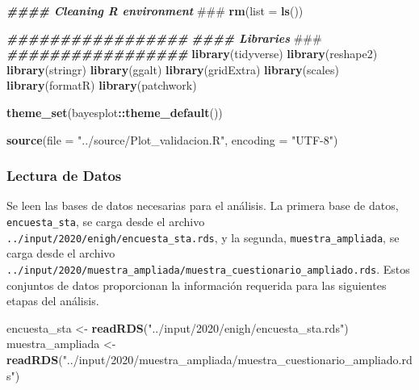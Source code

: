 \documentclass[
  12pt,
]{book}
\newenvironment{Shaded}{\begin{snugshade}}{\end{snugshade}}
\newcommand{\AlertTok}[1]{\textcolor[rgb]{0.94,0.16,0.16}{#1}}
\newcommand{\AttributeTok}[1]{\textcolor[rgb]{0.13,0.29,0.53}{#1}}
\newcommand{\DocumentationTok}[1]{\textcolor[rgb]{0.56,0.35,0.01}{\textbf{\textit{#1}}}}
\newcommand{\FunctionTok}[1]{\textcolor[rgb]{0.13,0.29,0.53}{\textbf{#1}}}
\newcommand{\NormalTok}[1]{#1}
\newcommand{\OtherTok}[1]{\textcolor[rgb]{0.56,0.35,0.01}{#1}}
\newcommand{\SpecialCharTok}[1]{\textcolor[rgb]{0.81,0.36,0.00}{\textbf{#1}}}
\newcommand{\StringTok}[1]{\textcolor[rgb]{0.31,0.60,0.02}{#1}}
\begin{document}
\begin{Shaded}
\begin{Highlighting}[]
\DocumentationTok{\#\#\#\# Cleaning R environment }\AlertTok{\#\#\#}
\FunctionTok{rm}\NormalTok{(}\AttributeTok{list =} \FunctionTok{ls}\NormalTok{())}

\DocumentationTok{\#\#\#\#\#\#\#\#\#\#\#\#\#\#\#\#\#}
\DocumentationTok{\#\#\#\# Libraries }\AlertTok{\#\#\#}
\DocumentationTok{\#\#\#\#\#\#\#\#\#\#\#\#\#\#\#\#\#}
\FunctionTok{library}\NormalTok{(tidyverse)}
\FunctionTok{library}\NormalTok{(reshape2)}
\FunctionTok{library}\NormalTok{(stringr)}
\FunctionTok{library}\NormalTok{(ggalt)}
\FunctionTok{library}\NormalTok{(gridExtra)}
\FunctionTok{library}\NormalTok{(scales)}
\FunctionTok{library}\NormalTok{(formatR)}
\FunctionTok{library}\NormalTok{(patchwork)}

\FunctionTok{theme\_set}\NormalTok{(bayesplot}\SpecialCharTok{::}\FunctionTok{theme\_default}\NormalTok{())}

\FunctionTok{source}\NormalTok{(}\AttributeTok{file =} \StringTok{"../source/Plot\_validacion.R"}\NormalTok{, }\AttributeTok{encoding =} \StringTok{"UTF{-}8"}\NormalTok{)}
\end{Highlighting}
\end{Shaded}

\hypertarget{lectura-de-datos-1}{%
\subsubsection*{Lectura de Datos}\label{lectura-de-datos-1}}

Se leen las bases de datos necesarias para el análisis. La primera base de datos, \texttt{encuesta\_sta}, se carga desde el archivo \texttt{../input/2020/enigh/encuesta\_sta.rds}, y la segunda, \texttt{muestra\_ampliada}, se carga desde el archivo \texttt{../input/2020/muestra\_ampliada/muestra\_cuestionario\_ampliado.rds}. Estos conjuntos de datos proporcionan la información requerida para las siguientes etapas del análisis.

\begin{Shaded}
\begin{Highlighting}[]
\NormalTok{encuesta\_sta }\OtherTok{\textless{}{-}} \FunctionTok{readRDS}\NormalTok{(}\StringTok{"../input/2020/enigh/encuesta\_sta.rds"}\NormalTok{)}
\NormalTok{muestra\_ampliada }\OtherTok{\textless{}{-}} \FunctionTok{readRDS}\NormalTok{(}\StringTok{"../input/2020/muestra\_ampliada/muestra\_cuestionario\_ampliado.rds"}\NormalTok{)}
\end{Highlighting}
\end{Shaded}
\end{document}
